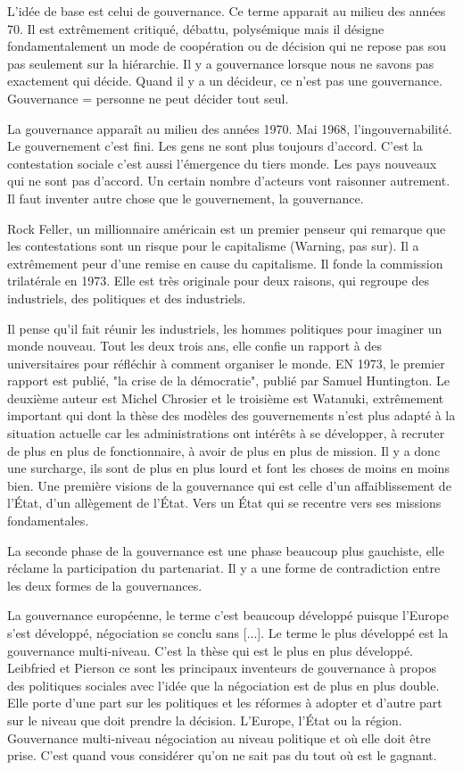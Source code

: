 L'idée de base est celui de gouvernance. Ce terme apparait au milieu des années 70. Il est extrêmement critiqué, débattu, polysémique mais il désigne fondamentalement un mode de coopération ou de décision qui ne repose pas sou pas seulement sur la hiérarchie. Il y a gouvernance lorsque nous ne savons pas exactement qui décide.
Quand il y a un décideur, ce n'est pas une gouvernance. Gouvernance = personne ne peut décider tout seul.

La gouvernance apparaît au milieu des années 1970. Mai 1968, l'ingouvernabilité. Le gouvernement c'est fini. Les gens ne sont plus toujours d'accord. C'est la contestation sociale c'est aussi l'émergence du tiers monde. Les pays nouveaux qui ne sont pas d'accord. Un certain nombre d'acteurs vont raisonner autrement. Il faut inventer autre chose que le gouvernement, la gouvernance.

Rock Feller, un millionnaire américain est un premier penseur qui remarque que les contestations sont un risque pour le capitalisme (Warning, pas sur). Il a extrêmement peur d'une remise en cause du capitalisme. Il fonde la commission trilatérale en 1973. Elle est très originale pour deux raisons, qui regroupe des industriels, des politiques et des industriels.

Il pense qu'il fait réunir les industriels, les hommes politiques pour imaginer un monde nouveau. Tout les deux trois ans, elle confie un rapport à des universitaires pour réfléchir à comment organiser le monde. EN 1973, le premier rapport est publié, "la crise de la démocratie", publié par Samuel Huntington. Le deuxième auteur est Michel Chrosier et le troisième est Watanuki, extrêmement important qui dont la thèse des modèles des gouvernements n'est plus adapté à la situation actuelle car les administrations ont intérêts à se développer, à recruter de plus en plus de fonctionnaire, à avoir de plus en plus de mission. Il y a donc une surcharge, ils sont de plus en plus lourd et font les choses de moins en moins bien. Une première visions de la gouvernance qui est celle d'un affaiblissement de l'État, d'un allègement de l'État. Vers un État qui se recentre vers ses missions fondamentales.

La seconde phase de la gouvernance est une phase beaucoup plus gauchiste, elle réclame la participation du partenariat. Il y a une forme de contradiction entre les deux formes de la gouvernances.

La gouvernance européenne, le terme c'est beaucoup développé puisque l'Europe s'est développé, négociation se conclu sans [...]. Le terme le plus développé est la gouvernance multi-niveau. C'est la thèse qui est le plus en plus développé. Leibfried et Pierson ce sont les principaux inventeurs de gouvernance à propos des politiques sociales avec l'idée que la négociation est de plus en plus double. Elle porte d'une part sur les politiques et les réformes à adopter et d'autre part sur le niveau que doit prendre la décision. L'Europe, l'État ou la région. Gouvernance multi-niveau négociation au niveau politique et où elle doit être prise. C'est quand vous considérer qu'on ne sait pas du tout où est le gagnant.

